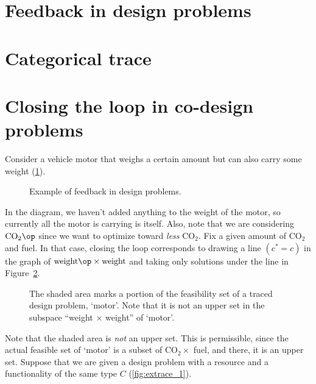 \section{Feedback in design problems}
\label{sec:feedbackindesign}

\section{Categorical trace}
\label{sec:feedbackindesign}


\section{Closing the loop in co-design problems}
\begin{example}Consider a vehicle motor that weighs a certain amount but can also carry some weight (\cref{fig:examplefeedback}).
\begin{figure}[h!]
\begin{center}
\end{center}
\caption{Example of feedback in design problems. \label{fig:examplefeedback}}
\end{figure}
In the diagram, we haven't added anything to the weight of the motor, so currently all the motor is carrying is itself. Also, note that we are considering $\text{CO}_2\op$ since we want to optimize toward \emph{less} CO$_2$. Fix a given amount of CO$_2$ and fuel. In that case, closing the loop corresponds to drawing a line $(c^\ast = c)$ in the graph of $\text{weight}\op \times \text{weight}$ and taking only solutions under the line in Figure~\ref{fig:weightcarrier}.
\begin{figure}[h!]
\centering
{}
\caption{The shaded area marks a portion of the feasibility set of a traced design problem, `motor'. Note that it is not an upper set in the subspace ``weight $\times$ weight'' of `motor'.}
\label{fig:weightcarrier}
\end{figure}
\end{example}

Note that the shaded area is \emph{not} an upper set. This is permissible, since the actual feasible set of `motor' is a subset of CO$_2 \times$ fuel, and there, it is an upper set.
Suppose that we are given a design problem with a resource and a functionality of the same type $C$ (\cref{fig:extrace_1}).

